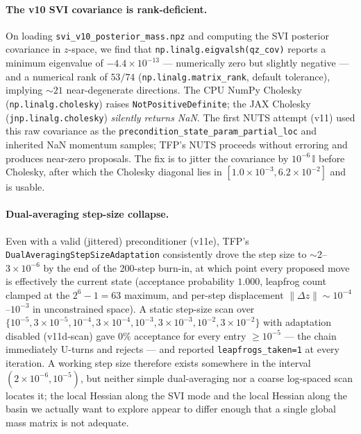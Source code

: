 \documentclass[11pt,letterpaper]{article}
\begin{document}
\paragraph{The v10 SVI covariance is rank-deficient.} On loading
\texttt{svi\_v10\_posterior\_mass.npz} and computing the SVI posterior
covariance in $z$-space, we find that \texttt{np.linalg.eigvalsh(qz\_cov)}
reports a minimum eigenvalue of $-4.4\times10^{-13}$ --- numerically zero
but slightly negative --- and a numerical rank of $53/74$
(\texttt{np.linalg.matrix\_rank}, default tolerance), implying $\sim 21$
near-degenerate directions. The CPU NumPy Cholesky
(\texttt{np.linalg.cholesky}) raises \texttt{NotPositiveDefinite}; the
JAX Cholesky (\texttt{jnp.linalg.cholesky}) {\it silently returns NaN}.
The first NUTS attempt (v11) used this raw covariance as the
\texttt{precondition\_state\_param\_partial\_loc} and inherited NaN
momentum samples; TFP's NUTS proceeds without erroring and produces
near-zero proposals. The fix is to jitter the covariance by
$10^{-6}\,\mathbb{I}$ before Cholesky, after which the Cholesky
diagonal lies in $[1.0\times10^{-3},6.2\times10^{-2}]$ and is usable.

\paragraph{Dual-averaging step-size collapse.} Even with a valid
(jittered) preconditioner (v11e), TFP's
\texttt{DualAveragingStepSizeAdaptation} consistently drove the step
size to $\sim$2--$3\times10^{-6}$ by the end of the 200-step burn-in,
at which point every proposed move is effectively the current state
(acceptance probability $1.000$, leapfrog count clamped at the
$2^{6}-1=63$ maximum, and per-step displacement $\|\Delta z\|\sim
10^{-4}$--$10^{-3}$ in unconstrained space). A static step-size scan
over $\{10^{-5},3\times10^{-5},10^{-4},3\times10^{-4},10^{-3},
3\times10^{-3},10^{-2},3\times10^{-2}\}$ with adaptation disabled
(v11d-scan) gave 0\% acceptance for every entry $\ge10^{-5}$ --- the
chain immediately U-turns and rejects --- and reported
\texttt{leapfrogs\_taken=1} at every iteration. A working step size
therefore exists somewhere in the interval $(2\times10^{-6},10^{-5})$,
but neither simple dual-averaging nor a coarse log-spaced scan locates
it; the local Hessian along the SVI mode and the local Hessian along
the basin we actually want to explore appear to differ enough that a
single global mass matrix is not adequate.
\end{document}
